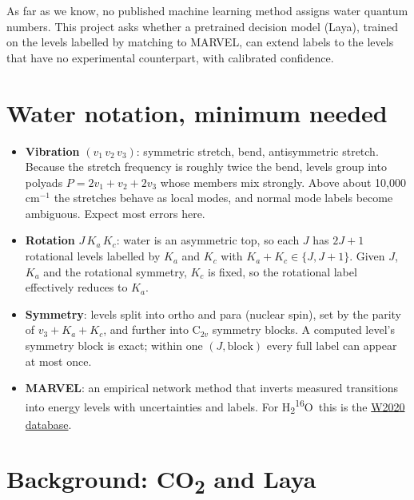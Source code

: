 \documentclass[11pt,a4paper]{article}
\newcommand{\water}{H\textsubscript{2}\textsuperscript{16}O}
\newcommand{\cotwo}{CO\textsubscript{2}}
\newcommand{\doi}[2]{\href{https://doi.org/#1}{#2}}
\begin{document}
As far as we know, no published machine learning method assigns water quantum numbers. This project asks whether a pretrained decision model (Laya), trained on the levels labelled by matching to MARVEL, can extend labels to the levels that have no experimental counterpart, with calibrated confidence.

\section{Water notation, minimum needed}

\begin{itemize}
  \item \textbf{Vibration} $(v_1\,v_2\,v_3)$: symmetric stretch, bend, antisymmetric stretch. Because the stretch frequency is roughly twice the bend, levels group into polyads $P = 2v_1 + v_2 + 2v_3$ whose members mix strongly. Above about 10,000\,cm$^{-1}$ the stretches behave as local modes, and normal mode labels become ambiguous. Expect most errors here.
  \item \textbf{Rotation} $J\,K_a\,K_c$: water is an asymmetric top, so each $J$ has $2J+1$ rotational levels labelled by $K_a$ and $K_c$ with $K_a + K_c \in \{J, J+1\}$. Given $J$, $K_a$ and the rotational symmetry, $K_c$ is fixed, so the rotational label effectively reduces to $K_a$.
  \item \textbf{Symmetry}: levels split into ortho and para (nuclear spin), set by the parity of $v_3 + K_a + K_c$, and further into C$_{2v}$ symmetry blocks. A computed level's symmetry block is exact; within one $(J, \text{block})$ every full label can appear at most once.
  \item \textbf{MARVEL}: an empirical network method that inverts measured transitions into energy levels with uncertainties and labels. For \water\ this is the \doi{10.1063/5.0008253}{W2020 database}.
\end{itemize}

\section{Background: \texorpdfstring{\cotwo}{CO2} and Laya}
\end{document}
